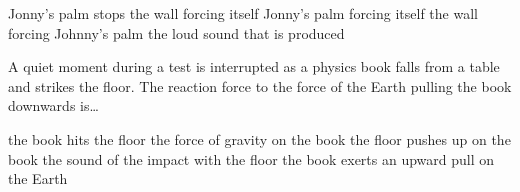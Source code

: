 \documentclass[]{exam}
\begin{document}
\begin{questions}
\begin{randomizechoices}
    \choice Jonny's palm stops
    \choice the wall forcing itself
    \choice Jonny's palm forcing itself
    \correctchoice the wall forcing Johnny's palm
    \choice the loud sound that is produced
\end{randomizechoices}

\question
A quiet moment during a test is interrupted as a physics book falls from a table and strikes the floor.  The reaction force to the force of the Earth pulling the book downwards is\dots 

\begin{randomizechoices}
    \choice the book hits the floor
    \choice the force of gravity on the book
    \choice the floor pushes up on the book
    \choice the sound of the impact with the floor
    \correctchoice the book exerts an upward pull on the Earth
\end{randomizechoices}

\end{questions}

\clearpage
\end{document}
